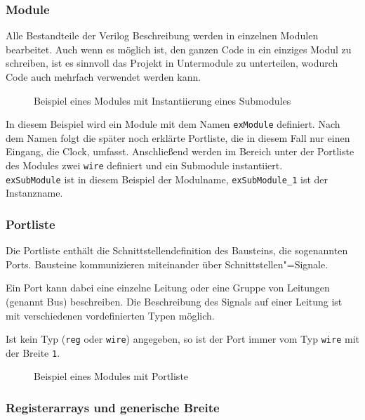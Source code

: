 \subsubsection*{Module}
Alle Bestandteile der Verilog Beschreibung werden in einzelnen Modulen bearbeitet. Auch wenn es möglich ist, den ganzen Code in ein einziges Modul zu schreiben, ist es sinnvoll das Projekt in Untermodule zu unterteilen, wodurch Code auch mehrfach verwendet werden kann. 

\begin{figure}[h]
	\lstset{style=verilog-style}
	
	\caption{Beispiel eines Modules mit Instantiierung eines Submodules}
	\label{module}
\end{figure}

In diesem Beispiel wird ein Module mit dem Namen \texttt{exModule} definiert. Nach dem Namen folgt die später noch erklärte Portliste, die in diesem Fall nur einen Eingang, die Clock, umfasst. Anschließend werden im Bereich unter der Portliste des Modules zwei \texttt{wire} definiert und ein Submodule instantiiert. \\
\texttt{exSubModule} ist in diesem Beispiel der Modulname, \texttt{exSubModule\_1} ist der Instanzname.

\subsubsection*{Portliste}
Die Portliste enthält die Schnittstellendefinition des Bausteins, die
sogenannten Ports. Bausteine kommunizieren miteinander über
Schnittstellen"=Signale.

Ein Port kann dabei eine einzelne Leitung oder eine Gruppe von
Leitungen (genannt Bus) beschreiben. Die Beschreibung des Signals auf einer
Leitung ist mit verschiedenen vordefinierten Typen möglich.

Ist kein Typ (\texttt{reg} oder \texttt{wire}) angegeben, so ist der Port immer vom Typ \texttt{wire} mit der Breite \texttt{1}.

\begin{figure}[H]
	\lstset{style=verilog-style}
	
	\caption{Beispiel eines Modules mit Portliste}
	\label{portlist}
\end{figure}

\subsubsection*{Registerarrays und generische Breite}

